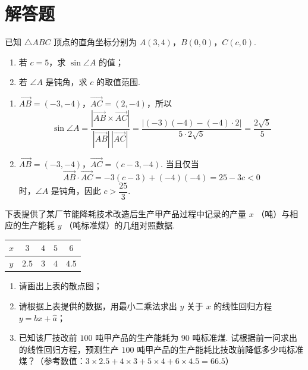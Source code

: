 \section{解答题}

\begin{problem}
已知 \(\triangle ABC\) 顶点的直角坐标分别为 \(A(3,4)\)，\(B(0,0)\)，\(C(c,0)\).

\begin{enumerate}
\item 若 \(c = 5\)，求 \( \sin \angle A \) 的值；
\item 若 \(\angle A\) 是钝角，求 \(c\) 的取值范围.
\end{enumerate}
\end{problem}

\begin{solution}
\begin{enumerate}
\item \(\overrightarrow{AB}=(-3,-4)\)，\(\overrightarrow{AC}=(2,-4)\)，所以
\[
\sin\angle A=\frac{\left|\overrightarrow{AB}\times\overrightarrow{AC}\right|}{|\overrightarrow{AB}|\,|\overrightarrow{AC}|}=\frac{|(-3)(-4)-(-4)\cdot2|}{5\cdot2\sqrt5}=\frac{2\sqrt5}{5}
\]

\item \(\overrightarrow{AB}=(-3,-4)\)，\(\overrightarrow{AC}=(c-3,-4)\). 当且仅当
\[
\overrightarrow{AB}\cdot\overrightarrow{AC}=-3(c-3)+(-4)(-4)=25-3c<0
\]
时，\(\angle A\) 是钝角，因此 \(c>\dfrac{25}{3}\).
\end{enumerate}
\end{solution}


\begin{problem}
下表提供了某厂节能降耗技术改造后生产甲产品过程中记录的产量 \(x\) （吨）与相应的生产能耗 \(y\) （吨标准煤）的几组对照数据.

\begin{center}
\begin{tabular}{|c|c|c|c|c|}
\hline
\(x\) & \(3\) & \(4\) & \(5\) & \(6\) \\
\hline
\(y\) & \(2.5\) & \(3\) & \(4\) & \(4.5\) \\
\hline
\end{tabular}
\end{center}

\begin{enumerate}
\item 请画出上表的散点图；
\item 请根据上表提供的数据，用最小二乘法求出 \(y\) 关于 \(x\) 的线性回归方程 \( y = bx + \hat{a} \)；
\item 已知该厂技改前 \(100\) 吨甲产品的生产能耗为 \(90\) 吨标准煤. 试根据前一问求出的线性回归方程，预测生产 \(100\) 吨甲产品的生产能耗比技改前降低多少吨标准煤？（参考数值：\( 3 \times 2.5 + 4 \times 3 + 5 \times 4 + 6 \times 4.5 = 66.5 \)）
\end{enumerate}
\end{problem}

